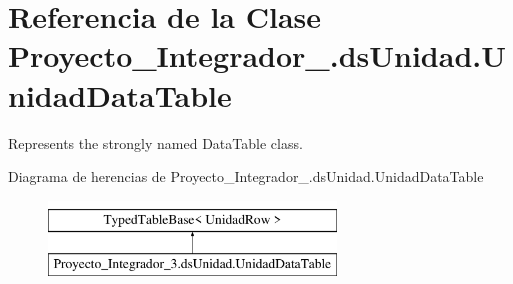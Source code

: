 \hypertarget{class_proyecto___integrador__3_1_1ds_unidad_1_1_unidad_data_table}{\section{Referencia de la Clase Proyecto\-\_\-\-Integrador\-\_.\-ds\-Unidad.\-Unidad\-Data\-Table}
\label{class_proyecto___integrador__3_1_1ds_unidad_1_1_unidad_data_table}
}


Represents the strongly named Data\-Table class.  


Diagrama de herencias de Proyecto\-\_\-\-Integrador\-\_.\-ds\-Unidad.\-Unidad\-Data\-Table\begin{figure}[H]
\begin{center}
\leavevmode
\includegraphics[height=2.000000cm]{class_proyecto___integrador__3_1_1ds_unidad_1_1_unidad_data_table}
\end{center}
\end{figure}
